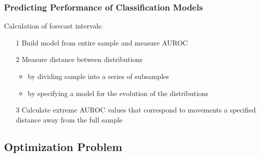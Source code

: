 \documentclass{beamer}
\begin{document}
\begin{frame}
\frametitle{Predicting Performance of Classification Models}

Calculation of forecast intervals:
    \begin{itemize}
        \item[1] Build model from entire sample and measure AUROC
        \item[2] Measure distance between distributions 
            \begin{itemize}
                \item by dividing sample into a series of subsamples
                \item by specifying a model for the evolution of the distributions
            \end{itemize}
        \item[3] Calculate extreme AUROC values that correspond to movements a specified distance away from the full sample
    \end{itemize}

\end{frame}




\subsection{Optimization Problem}


\end{document}
